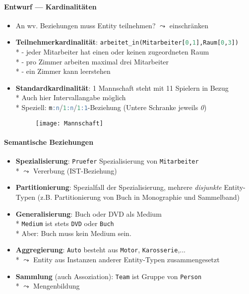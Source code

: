 \paragraph{Entwurf --- Kardinalitäten}
\begin{itemize}
	\item An wv. Beziehungen muss Entity teilnehmen? \( \leadsto \) einschränken
	\item \textbf{Teilnehmerkardinalität}: \lstinline[language=sql]{arbeitet_in(Mitarbeiter[0,1],Raum[0,3])} \\*
		- jeder Mitarbeiter hat einen oder keinen zugeordneten Raum \\*
	 	- pro Zimmer arbeiten maximal drei Mitarbeiter \\*
	 	- ein Zimmer kann leerstehen
	 \item \textbf{Standardkardinalität}: 1 Mannschaft steht mit 11 Spielern in Bezug \\*
	 Auch hier Intervallangabe möglich\\*
	  Speziell: \lstinline[language=sql]{m:n}/\lstinline[language=sql]{1:n}/\lstinline[language=sql]{1:1}-Beziehung (Untere Schranke jeweils \emph{0})
	 \begin{figure}[H]\centering\label{Mannschaft}\texttt{[image: Mannschaft]}\end{figure}
\end{itemize}





\paragraph{Semantische Beziehungen}
\begin{itemize}
	\item \textbf{Spezialisierung}: \lstinline[language=sql]{Pruefer} Spezialisierung von \lstinline[language=sql]{Mitarbeiter} \\* \( \leadsto \) Vererbung (IST-Beziehung)
	\item \textbf{Partitionierung}: Spezialfall der Spezialisierung, mehrere \emph{disjunkte} Entity-Typen (z.B. Partitionierung von Buch in Monographie und Sammelband)
	\item \textbf{Generalisierung}: Buch oder DVD als Medium \\*
	\lstinline[language=sql]{Medium} ist stets \lstinline[language=sql]{DVD} oder \lstinline[language=sql]{Buch} \\* Aber: Buch muss kein Medium sein.
	\item \textbf{Aggregierung}: \lstinline[language=sql]{Auto} besteht aus \lstinline[language=sql]{Motor}, \lstinline[language=sql]{Karosserie},... \\* \( \leadsto \) Entity aus Instanzen anderer Entity-Typen zusammengesetzt
	\item \textbf{Sammlung} (auch Assoziation): \lstinline[language=sql]{Team} ist Gruppe von \lstinline[language=sql]{Person} \\* \( \leadsto \) Mengenbildung
\end{itemize}

